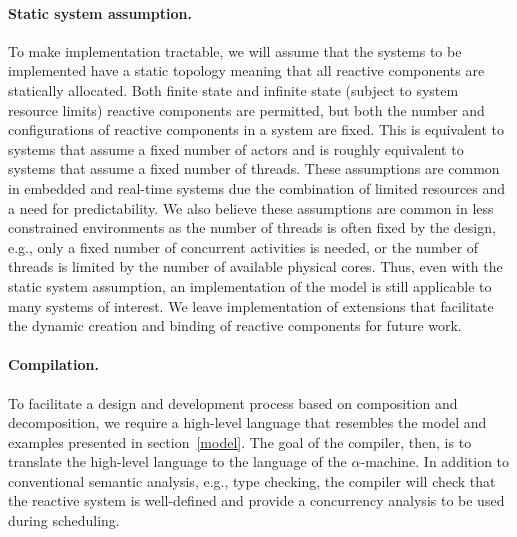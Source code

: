 \paragraph{Static system assumption.}
To make implementation tractable, we will assume that the systems to be implemented have a static topology meaning that all reactive components are statically allocated.
Both finite state and infinite state (subject to system resource limits) reactive components are permitted, but both the number and configurations of reactive components in a system are fixed.
This is equivalent to systems that assume a fixed number of actors and is roughly equivalent to systems that assume a fixed number of threads.
These assumptions are common in embedded and real-time systems due the combination of limited resources and a need for predictability.
We also believe these assumptions are common in less constrained environments as the number of threads is often fixed by the design, e.g., only a fixed number of concurrent activities is needed, or the number of threads is limited by the number of available physical cores.
Thus, even with the static system assumption, an implementation of the model is still applicable to many systems of interest.
We leave implementation of extensions that facilitate the dynamic creation and binding of reactive components for future work.

\paragraph{Compilation.}
To facilitate a design and development process based on composition and decomposition, we require a high-level language that resembles the model and examples presented in section~\ref{model}.
The goal of the compiler, then, is to translate the high-level language to the language of the $\alpha$-machine.
In addition to conventional semantic analysis, e.g., type checking, the compiler will check that the reactive system is well-defined and provide a concurrency analysis to be used during scheduling.

